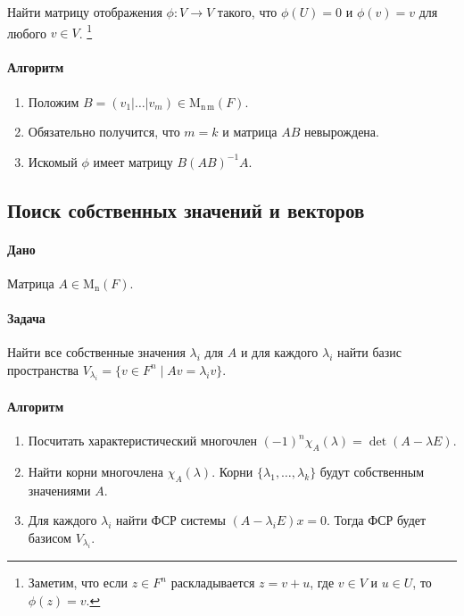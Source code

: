 \documentclass{article}
\newcommand{\MatrixDim}[3]{\operatorname{\mathrm{M}_{#2\,#3}}(#1)}
\newcommand{\Matrix}[2]{\operatorname{\mathrm{M}_{#2}}(#1)}
\begin{document}
Найти матрицу отображения $\phi\colon V\to V$ такого, что $\phi(U) = 0$ и $\phi(v) = v$ для любого $v\in V$.%
\footnote{Заметим, что если $z\in F^{n}$ раскладывается $z = v + u$, где $v\in V$ и $u\in U$, то $\phi(z) = v$.}

\paragraph{Алгоритм}

\begin{enumerate}
\item Положим $B = (v_1|\ldots|v_m)\in \MatrixDim{F}{n}{m}$.

\item Обязательно получится, что $m = k$ и матрица $AB$ невырождена.

\item Искомый $\phi$ имеет матрицу $B(AB)^{-1}A$.
\end{enumerate}

\subsection{Поиск собственных значений и векторов}

\paragraph{Дано}

Матрица $A\in\Matrix{F}{n}$.

\paragraph{Задача}

Найти все собственные значения $\lambda_i$ для $A$ и для каждого $\lambda_i$ найти базис пространства $V_{\lambda_i} = \{v\in F^{n}\mid A v = \lambda_i v\}$.

\paragraph{Алгоритм}

\begin{enumerate}
\item Посчитать характеристический многочлен $(-1)^n\chi_A(\lambda) = \det(A-\lambda E)$.

\item Найти корни многочлена $\chi_A(\lambda)$.
Корни $\{\lambda_1,\ldots,\lambda_k\}$ будут собственным значениями $A$.

\item Для каждого $\lambda_i$ найти ФСР системы $(A-\lambda_i E)x = 0$.
Тогда ФСР будет базисом $V_{\lambda_i}$.
\end{enumerate}
\end{document}
